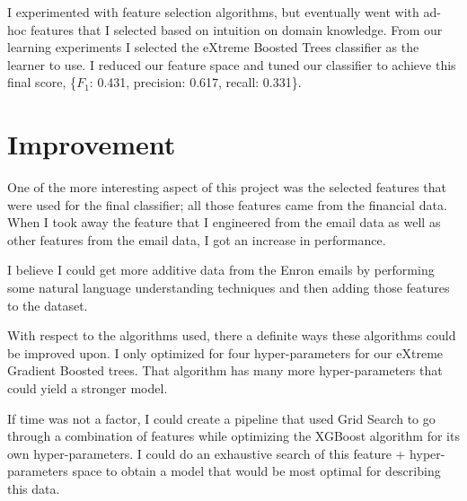 \documentclass[titlepage,numbers=noenddot,headinclude,%
               footinclude=true,abstractoff,BCOR=5mm,%
               paper=a4,fontsize=11pt,ngerman,american]{scrreprt}
\numberwithin{theorem}{chapter}
\numberwithin{definition}{chapter}
\numberwithin{algorithm}{chapter}
\numberwithin{figure}{chapter}
\numberwithin{table}{chapter}
\numberwithin{equation}{chapter}
\begin{document}
I experimented with feature selection algorithms, but eventually went with ad-hoc features that I selected based on intuition on domain knowledge. From our learning experiments I selected the eXtreme Boosted Trees classifier as the learner to use. I reduced our feature space and tuned our classifier to achieve this final score, \{$F_1$: 0.431, precision: 0.617, recall: 0.331\}.

\section*{Improvement}
One of the more interesting aspect of this project was the selected features that were used for the final classifier; all those features came from the financial data. When I took away the feature that I engineered from the email data as well as other features from the email data, I got an increase in performance.

I believe I could get more additive data from the Enron emails by performing some natural language understanding techniques and then adding those features to the dataset.

With respect to the algorithms used, there a definite ways these algorithms could be improved upon. I only optimized for four hyper-parameters for our eXtreme Gradient Boosted trees. That algorithm has many more hyper-parameters that could yield a stronger model.

If time was not a factor, I could create a pipeline that used Grid Search to go through a combination of features while optimizing the XGBoost algorithm for its own hyper-parameters. I could do an exhaustive search of this feature + hyper-parameters space to obtain a model that would be most optimal for describing this data.



\vspace{4\baselineskip}\vspace{-\parskip} %
\footnotesize %

\end{document}

